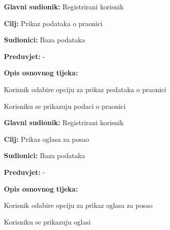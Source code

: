 \noindent {}
\begin{packed_item}
	
	\item \textbf{Glavni sudionik: } Registrirani korisnik
	\item  \textbf{Cilj:} Prikaz podataka o praonici
	\item  \textbf{Sudionici:} Baza podataka
	\item  \textbf{Preduvjet:} -
	\item  \textbf{Opis osnovnog tijeka:}
	
	\item[] \begin{packed_enum}
		
		\item Korisnik odabire opciju za prikaz podataka o praonici
		\item Korisniku se prikazuju podaci o praonici
		
	\end{packed_enum}
	
\end{packed_item}

\noindent {}
\begin{packed_item}
	
	\item \textbf{Glavni sudionik:} Registrirani korisnik
	\item  \textbf{Cilj:} Prikaz oglasa za posao
	\item  \textbf{Sudionici:} Baza podataka
	\item  \textbf{Preduvjet:} -
	\item  \textbf{Opis osnovnog tijeka:}
	
	\item[] \begin{packed_enum}
		
		\item Korisnik odabire opciju za prikaz oglasa za posao
		\item Korisniku se prikazuju oglasi
		
	\end{packed_enum}
	
\end{packed_item}

